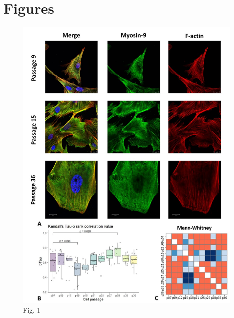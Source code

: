 \documentclass[alpha-refs]{wiley-article}
\begin{document}
\section*{Figures}


\begin{figure}[hbt!]
\centering
\includegraphics[width=0.9\linewidth]{myosin-9.jpg}
\caption{Fig. 1}
\end{figure}
\end{document}

